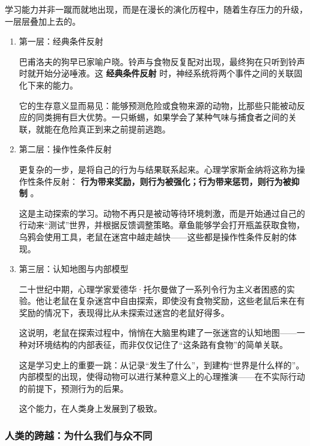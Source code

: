 \documentclass[11pt]{article}
\begin{document}
学习能力并非一蹴而就地出现，而是在漫长的演化历程中，随着生存压力的升级，一层层叠加上去的。
\begin{enumerate}
\item 第一层：经典条件反射
\label{sec:org614c849}

巴甫洛夫的狗早已家喻户晓。铃声与食物反复配对出现，最终狗在只听到铃声时就开始分泌唾液。这 \textbf{经典条件反射} 时，神经系统将两个事件之间的关联固化下来的能力。

它的生存意义显而易见：能够预测危险或食物来源的动物，比那些只能被动反应的同类拥有巨大优势。一只蜥蜴，如果学会了某种气味与捕食者之间的关联，就能在危险真正到来之前提前逃跑。
\item 第二层：操作性条件反射
\label{sec:orgd5fecbb}

更复杂的一步，是将自己的行为与结果联系起来。心理学家斯金纳将这称为操作性条件反射： \textbf{行为带来奖励，则行为被强化；行为带来惩罚，则行为被抑制} 。

这是主动探索的学习。动物不再只是被动等待环境刺激，而是开始通过自己的行动来“测试”世界，并根据反馈调整策略。章鱼能够学会打开瓶盖获取食物，乌鸦会使用工具，老鼠在迷宫中越走越快——这些都是操作性条件反射的体现。
\item 第三层：认知地图与内部模型
\label{sec:org929d001}

二十世纪中期，心理学家爱德华·托尔曼做了一系列令行为主义者困惑的实验。他让老鼠在复杂迷宫中自由探索，即使没有食物奖励，这些老鼠后来在有奖励的情况下，表现得比从未探索过迷宫的老鼠好得多。

这说明，老鼠在探索过程中，悄悄在大脑里构建了一张迷宫的认知地图——一种对环境结构的内部表征，而非仅仅记住了“这条路有食物”的简单关联。

这是学习史上的重要一跳：从记录“发生了什么”，到建构“世界是什么样的”。内部模型的出现，使得动物可以进行某种意义上的心理推演——在不实际行动的前提下，预测行为的后果。

这个能力，在人类身上发展到了极致。
\end{enumerate}
\subsubsection{人类的跨越：为什么我们与众不同}
\label{sec:org76e0d89}
\end{document}
